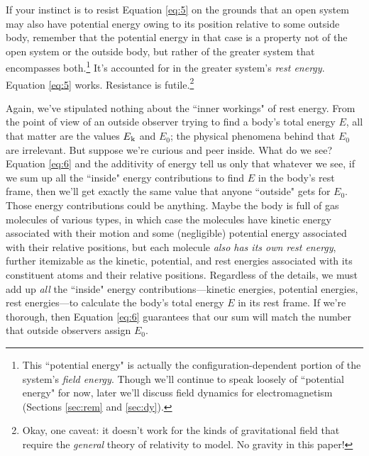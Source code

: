 \documentclass[12pt]{article}
\begin{document}
If your instinct is to resist Equation \ref{eq:5} on the grounds that an open system may also have potential energy owing to its position relative to some outside body, remember that the potential energy in that case is a property not of the open system or the outside body, but rather of the greater system that encompasses both.\footnote{This ``potential energy" is actually the configuration-dependent portion of the system's \emph{field energy}. Though we'll continue to speak loosely of ``potential energy" for now, later we'll discuss field dynamics for electromagnetism (Sections \ref{sec:rem} and \ref{sec:dy}).} It's accounted for in the greater system's \emph{rest energy}. Equation \ref{eq:5} works. Resistance is futile.\footnote{Okay, one caveat: it doesn't work for the kinds of gravitational field that require the \emph{general} theory of relativity to model. No gravity in this paper!}

Again, we've stipulated nothing about the ``inner workings" of rest energy. From the point of view of an outside observer trying to find a body's total energy $E$, all that matter are the values $E_{\mkern.5mu \textrm{k}}$ and $E_0$; the physical phenomena behind that $E_0$ are irrelevant. But suppose we're curious and peer inside. What do we see? Equation \ref{eq:6} and the additivity of energy tell us only that whatever we see, if we sum up all the ``inside" energy contributions to find $E$ in the body's rest frame, then we'll get exactly the same value that anyone ``outside" gets for $E_0$. Those energy contributions could be anything. Maybe the body is full of gas molecules of various types, in which case the molecules have kinetic energy associated with their motion and some (negligible) potential energy associated with their relative positions, but each molecule \emph{also has its own rest energy}, further itemizable as the kinetic, potential, and rest energies associated with its constituent atoms and their relative positions. Regardless of the details, we must add up \emph{all} the ``inside" energy contributions---kinetic energies, potential energies, rest energies---to calculate the body's total energy $E$ in its rest frame. If we're thorough, then Equation \ref{eq:6} guarantees that our sum will match the number that outside observers assign $E_0$.
\end{document}
